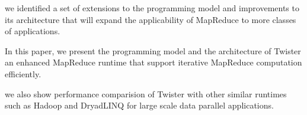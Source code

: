 we identified a set of extensions to the 
programming model and improvements to its architecture
that will expand the applicability of MapReduce to more classes
of applications.

In this paper, we present the programming model
and the architecture of Twister an enhanced MapReduce
runtime that support iterative MapReduce computation efficiently.

we also show performance comparision of Twister with
other similar runtimes such as Hadoop and DryadLINQ 
for large scale data parallel applications.
